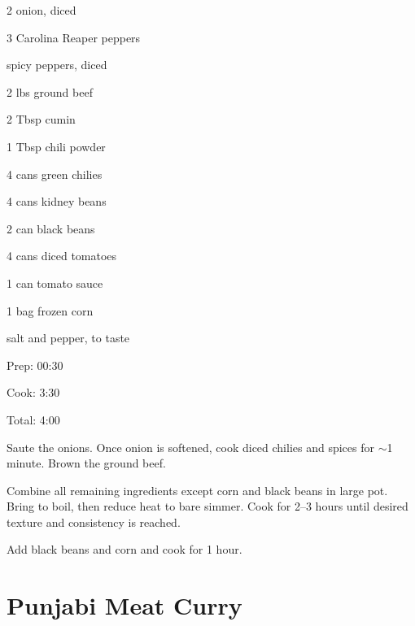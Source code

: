\documentclass[oneside]{book}  %
\def\thisrecipe{}  %
\newcommand{\recipe}[1]{\section{#1}\def\thisrecipe{: #1}} %
\newcommand{\itemNL}{\item[] \hspace{-\labelsep}}  %
\newcommand{\about}{$\sim$}
\begin{document}
\begin{IT}
  \begin{ingredients}
    \item[2] onion, diced
    \item[3] Carolina Reaper peppers
    \itemNL spicy peppers, diced
    \item[2 lbs] ground beef
    \item[2 Tbsp] cumin
    \item[1 Tbsp] chili powder
    \item[4 cans] green chilies
    \item[4 cans] kidney beans
    \item[2 can] black beans
    \item[4 cans] diced tomatoes
    \item[1 can] tomato sauce
    \item[1 bag] frozen corn
    \itemNL salt and pepper, to taste
  \end{ingredients}

  \switchcolumn

  \begin{timeline}
    \item[Prep:]  00:30
    \item[Cook:]  3:30
    \item[Total:] 4:00
  \end{timeline}
\end{IT}

\begin{directions}
  \item Saute the onions. Once onion is softened, cook diced chilies and spices
    for \about 1 minute. Brown the ground beef.

  \item Combine all remaining ingredients except corn and black beans in large
    pot. Bring to boil, then reduce heat to bare simmer. Cook for 2--3 hours
    until desired texture and consistency is reached.

  \item Add black beans and corn and cook for 1 hour.
\end{directions}
\recipe{Punjabi Meat Curry} \label{recipe:punjabi_meat_curry} %
\end{document}
